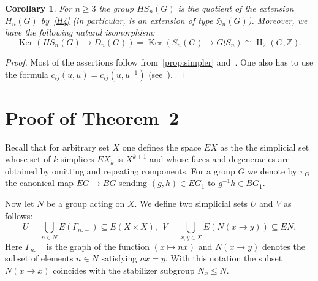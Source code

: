 \documentclass[oneside, 10pt]{amsart}
\theoremstyle{plain}
\numberwithin{equation}{section}
\numberwithin{lemma}{section}
\newtheorem{cor}[lemma]{Corollary}
\theoremstyle{remark}
\theoremstyle{definition}
\DeclareMathOperator{\HH}{H}
\DeclareMathOperator{\Ker}{Ker}
\newcommand{\ZZ}{\mathbb{Z}}
\begin{document}
\begin{cor} \label{cor:main} For $n \geq 3$ the group $HS_n(G)$ is the quotient of the extension $H_n(G)$ by~\eqref{H4} (in particular, 
 is an extension of type $\mathfrak{H}_n(G)$).
Moreover, we have the following natural isomorphism:
\begin{equation} \Ker(HS_n(G) \to D_n(G)) = \Ker(S_n(G) \to G \wr S_n) \cong \HH_2(G, \ZZ). \end{equation} \end{cor}
\begin{proof}
Most of the assertions follow from~\cref{prop:simpler} and~\cite[Proposition~5]{De76}.
One also has to use the formula $c_{ij}(u, u) = c_{ij}(u, u^{-1})$ (see~\cite[p.~87]{Reh78}).
\end{proof}

\section{Proof of Theorem~2} \label{sec:main}
Recall that for arbitrary set $X$ one defines the space $EX$ as the the simplicial set whose set of $k$-simplices $EX_k$
 is $X^{k+1}$ and whose faces and degeneracies are obtained by omitting and repeating components. 
For a group $G$ we denote by $\pi_G$ the canonical map $EG \to BG$ sending $(g, h) \in EG_1$ to $g^{-1}h \in BG_1$.
 
Now let $N$ be a group acting on $X$. We define two simplicial sets $U$ and $V$ as follows:
\[ U = \bigcup\limits_{n\in N} E(\Gamma_{n.-}) \subseteq E(X\times X),\ \ V = \bigcup\limits_{x,y\in X}E(N(x\to y)) \subseteq EN. \]
Here $\Gamma_{n.-}$ is the graph of the function $(x \mapsto nx)$ and $N(x\to y)$ denotes the subset of elements $n\in N$ satisfying $nx=y$.
With this notation the subset $N(x\to x)$ coincides with the stabilizer subgroup $N_x \leq N$.
\end{document}
